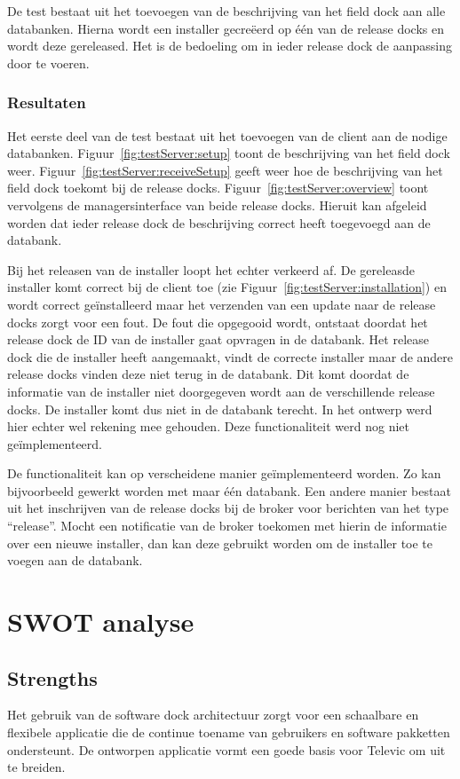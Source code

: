 De test bestaat uit het toevoegen van de beschrijving van het field dock aan alle databanken.
Hierna wordt een installer gecreëerd op één van de release docks en wordt deze gereleased.
Het is de bedoeling om in ieder release dock de aanpassing door te voeren.

\subsubsection{Resultaten}
Het eerste deel van de test bestaat uit het toevoegen van de client aan de nodige databanken.
Figuur~\ref{fig:testServer:setup} toont de beschrijving van het field dock weer.
Figuur~\ref{fig:testServer:receiveSetup} geeft weer hoe de beschrijving van het field dock toekomt bij de release docks.
Figuur~\ref{fig:testServer:overview} toont vervolgens de managersinterface van beide release docks.
Hieruit kan afgeleid worden dat ieder release dock de beschrijving correct heeft toegevoegd aan de databank.

Bij het releasen van de installer loopt het echter verkeerd af.
De gereleasde installer komt correct bij de client toe (zie Figuur~\ref{fig:testServer:installation}) en wordt correct geïnstalleerd  maar het verzenden van een update naar de release docks zorgt voor een fout.
De fout die opgegooid wordt, ontstaat doordat het release dock de ID van de installer gaat opvragen in de databank.
Het release dock die de installer heeft aangemaakt, vindt de correcte installer maar de andere release docks vinden deze niet terug in de databank.
Dit komt doordat de informatie van de installer niet doorgegeven wordt aan de verschillende release docks.
De installer komt dus niet in de databank terecht.
In het ontwerp werd hier echter wel rekening mee gehouden.
Deze functionaliteit werd nog niet geïmplementeerd.

De functionaliteit kan op verscheidene manier geïmplementeerd worden.
Zo kan bijvoorbeeld gewerkt worden met maar één databank.
Een andere manier bestaat uit het inschrijven van de release docks bij de broker voor berichten van het type ``release''.
Mocht een notificatie van de broker toekomen met hierin de informatie over een nieuwe installer, dan kan deze gebruikt worden om de installer toe te voegen aan de databank.


\section{SWOT analyse}
\subsection{Strengths}
Het gebruik van de software dock architectuur zorgt voor een schaalbare en flexibele applicatie die de continue toename van gebruikers en software pakketten ondersteunt.
De ontworpen applicatie vormt een goede basis voor Televic om uit te breiden.

